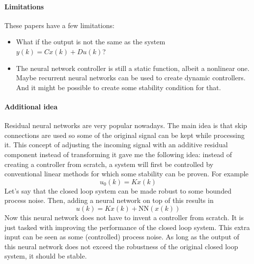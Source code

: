 \paragraph{Limitations} These papers have a few limitations:
\begin{itemize}
    \item What if the output is not the same as the system $y(k) = C x(k) + D u(k)$?
    \item The neural network controller is still a static function, albeit a nonlinear one. Maybe recurrent neural networks can be used to create dynamic controllers. And it might be possible to create some stability condition for that.
\end{itemize}

\paragraph{Additional idea} Residual neural networks are very popular nowadays. The main idea is that skip connections are used so some of the original signal can be kept while processing it. This concept of adjusting the incoming signal with an additive residual component instead of transforming it gave me the following idea: instead of creating a controller from scratch, a system will first be controlled by conventional linear methods for which some stability can be proven. For example
\begin{equation*}
    u_0(k) = K x(k)
\end{equation*}
Let's say that the closed loop system can be made robust to some bounded process noise. Then, adding a neural network on top of this results in
\begin{equation*}
    u(k) = K x(k) + \text{NN}(x(k))
\end{equation*}
Now this neural network does not have to invent a controller from scratch. It is just tasked with improving the performance of the closed loop system. This extra input can be seen as some (controlled) process noise. As long as the output of this neural network does not exceed the robustness of the original closed loop system, it should be stable.

